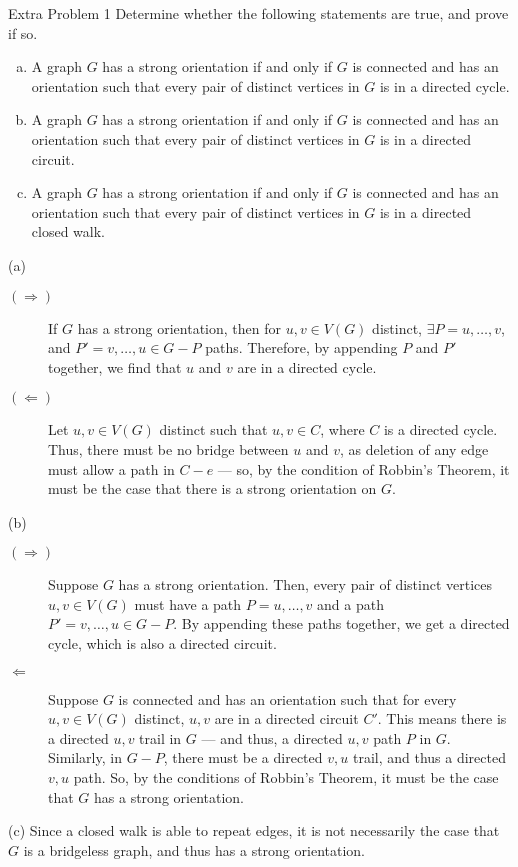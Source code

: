 \documentclass[8pt]{extarticle}
\begin{document}
  \begin{problem}{Extra Problem 1}
    Determine whether the following statements are true, and prove if so.
    \begin{enumerate}[(a)]
      \item A graph $G$ has a strong orientation if and only if $G$ is connected and has an orientation such that every pair of distinct vertices in $G$ is in a directed cycle.
      \item A graph $G$ has a strong orientation if and only if $G$ is connected and has an orientation such that every pair of distinct vertices in $G$ is in a directed circuit.
      \item A graph $G$ has a strong orientation if and only if $G$ is connected and has an orientation such that every pair of distinct vertices in $G$ is in a directed closed walk.
    \end{enumerate}
    \tcblower
    \begin{problem}{(a)}
      \begin{description}
        \item[$(\Rightarrow)$] If $G$ has a strong orientation, then for $u,v\in V(G)$ distinct, $\exists P = u,\dots,v$, and $P' = v,\dots,u\in G - P$ paths. Therefore, by appending $P$ and $P'$ together, we find that $u$ and $v$ are in a directed cycle.
        \item[$(\Leftarrow)$] Let $u,v\in V(G)$ distinct such that $u,v \in C$, where $C$ is a directed cycle. Thus, there must be no bridge between $u$ and $v$, as deletion of any edge must allow a path in $C - e$ --- so, by the condition of Robbin's Theorem, it must be the case that there is a strong orientation on $G$.
      \end{description}
    \end{problem}
    \begin{problem}{(b)}
      \begin{description}
        \item[$(\Rightarrow)$] Suppose $G$ has a strong orientation. Then, every pair of distinct vertices $u,v\in V(G)$ must have a path $P = u,\dots,v$ and a path $P' = v,\dots,u\in G-P$. By appending these paths together, we get a directed cycle, which is also a directed circuit.
        \item[$\Leftarrow$] Suppose $G$ is connected and has an orientation such that for every $u,v\in V(G)$ distinct, $u,v$ are in a directed circuit $C'$. This means there is a directed $u,v$ trail in $G$ --- and thus, a directed $u,v$ path $P$ in $G$. Similarly, in $G - P$, there must be a directed $v,u$ trail, and thus a directed $v,u$ path. So, by the conditions of Robbin's Theorem, it must be the case that $G$ has a strong orientation.
      \end{description}
    \end{problem}
    \begin{problem}{(c)}
      Since a closed walk is able to repeat edges, it is not necessarily the case that $G$ is a bridgeless graph, and thus has a strong orientation.
    \end{problem}
  \end{problem}
\end{document}
